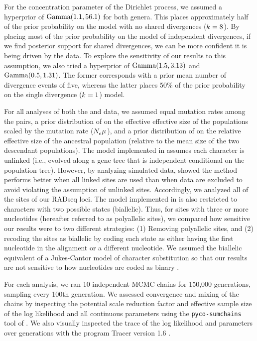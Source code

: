 For the concentration parameter of the Dirichlet process, we assumed
a hyperprior of $\textrm{Gamma}(1.1, 56.1)$ for both genera.
This places approximately half of the prior probability on the model
with no shared divergences ($k_{} = 8$).
By placing most of the prior probability on the model of independent
divergences, if we find posterior support for shared divergences, we can be
more confident it is being driven by the data.
To explore the sensitivity of our results to this assumption, we also
tried a hyperprior of
$\textrm{Gamma}(1.5, 3.13)$
and
$\textrm{Gamma}(0.5, 1.31)$.
The former corresponds with a prior mean number of divergence events of five,
whereas the latter places 50\% of the prior probability on the single
divergence ($k_{} = 1$) model.

For all analyses of both the  and  data, we
assumed equal mutation rates among the pairs, a prior distribution of
 on the effective effective size of the populations scaled
by the mutation rate ($N_{e}^{}{}\mu_{}{}$), and a
prior distribution of  on the relative effective size of the
ancestral population (relative to the mean size of the two descendant
populations).
The model implemented in \ecoevolity assumes each character is unlinked (i.e.,
evolved along a gene tree that is independent conditional on the population
tree).
However, by analyzing simulated data, \citet{Oaks2018ecoevolity} showed
the method performs better when all linked sites are used than when data are
excluded to avoid violating the assumption of unlinked sites.
Accordingly, we analyzed all of the sites of our RADseq loci.
The model implemented in \ecoevolity is also restricted to characters with two
possible states (biallelic).
Thus, for sites with three or more nucleotides (hereafter referred to as
polyallelic sites), we compared how sensitive our
results were to two different strategies:
(1) Removing polyallelic sites, and
(2) recoding the sites as biallelic by coding each state as either having the
first nucleotide in the alignment or a different nucleotide.
We assumed the biallelic equivalent of a Jukes-Cantor model of character
substitution \citep{JC1969} so that our results are not sensitive to how
nucleotides are coded as binary
\citep{Oaks2018ecoevolity}.

For each analysis, we ran 10 independent MCMC chains for 150,000 generations,
sampling every 100th generation.
We assessed convergence and mixing of the chains by inspecting the potential
scale reduction factor \citet[the square root of Equation 1.1 in][]{Brooks1998}
and effective sample size \citep{Gong2014} of the log likelihood and all
continuous parameters using the \texttt{pyco-sumchains} tool of \pycoevolity.
We also visually inspected the trace of the log likelihood and parameters over
generations with the program Tracer version 1.6 \citep{Tracer16}.


